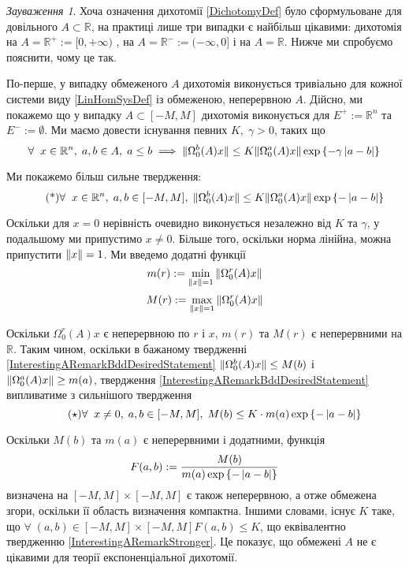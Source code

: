 \documentclass[14pt]{extarticle} %
\let\oldforall\forall
\renewcommand{\forall}{\oldforall\;}
\theoremstyle{remark}
\newtheorem{remark}{Зауваження}
\begin{document}
\begin{remark}
	Хоча означення дихотомії \ref{DichotomyDef} було сформульоване для довільного $A\subset\mathbb{R}$, на практиці лише три випадки є 
	найбільш цікавими: дихотомія на $A=\mathbb{R}^+:=[0,+\infty)$
	, на $A=\mathbb{R}^-:=(-\infty,0]$ і на $A=\mathbb{R}$. Нижче ми спробуємо пояснити, чому це так.

	По-перше, у випадку обмеженого $A$ дихотомія виконується тривіально для кожної системи виду \ref{LinHomSysDef} із обмеженою, неперервною
	$A$. Дійсно, ми покажемо що у випадку $A\subset[-M,M]$ дихотомія виконується для $E^+:=\mathbb{R}^n$ та $E^-:=\emptyset$. Ми маємо
	довести існування певних $K,\;\gamma>0$, таких що
	\[\forall x\in\mathbb{R}^n,\;a,b\in A,\;a\leq b\implies 
	\mynorm{\Omega^b_0(A){x}}\leq K\mynorm{\Omega_0^a(A){x}}\exp\left\{-\gamma\myabs{a-b}\right\}\\
	\]

	Ми покажемо більш сильне твердження:
	\[\tag{*}\label{InterestingARemarkBddDesiredStatement}
	\forall x\in\mathbb{R}^n,\;a,b\in [-M,M],\;
	\mynorm{\Omega^b_0(A){x}}\leq K\mynorm{\Omega_0^a(A){x}}\exp\left\{-\myabs{a-b}\right\}\\
	\]
	
	Оскільки для $x=0$ нерівність очевидно виконується незалежно від $K$ та $\gamma$, у подальшому ми припустимо $x\neq 0$. Більше того,
	оскільки норма лінійна, можна припустити $\|x\|=1$. Ми введемо додатні функції
	\[m(r):=\min_{\mynorm{x}=1}\mynorm{\Omega^r_0(A)x}\]
	\[M(r):=\max_{\mynorm{x}=1}\mynorm{\Omega^r_0(A)x}\]
	
	Оскільки $\Omega_0^r(A)x$ є неперервною по $r$ і $x$, $m(r)$ та $M(r)$ є неперервними на $\mathbb{R}$. Таким чином, оскільки в 
	бажаному твердженні \ref{InterestingARemarkBddDesiredStatement} $\|\Omega^b_0(A)x\|\leq M(b)$ і $\|\Omega^a_0(A)x\|
	\geq m(a)$, твердження \ref{InterestingARemarkBddDesiredStatement} випливатиме з сильнішого твердження
	\[\tag{$\star$}\label{InterestingARemarkStronger}
	\forall x\neq 0,\;a,b\in [-M,M],\;
	M(b)\leq K\cdot m(a)\exp\left\{-\myabs{a-b}\right\}\\
	\]

	Оскільки $M(b)$ та $m(a)$ є неперервними і додатними, функція 
	\[F(a,b):=\frac{M(b)}{m(a)\exp\left\{-\left|a-b\right|\right\}}\]
	визначена на $[-M,M]\times[-M,M]$ є також неперервною, а отже обмежена згори, оскільки її область визначення компактна. Іншими словами,
	існує $K$ таке, що $\forall (a,b)\in[-M,M]\times[-M,M] F(a,b)\leq K$, що еквівалентно твердженню
	\ref{InterestingARemarkStronger}. Це показує, що обмежені $A$ не є цікавими для теорії експоненціальної дихотомії.


\end{remark}
\end{document}
